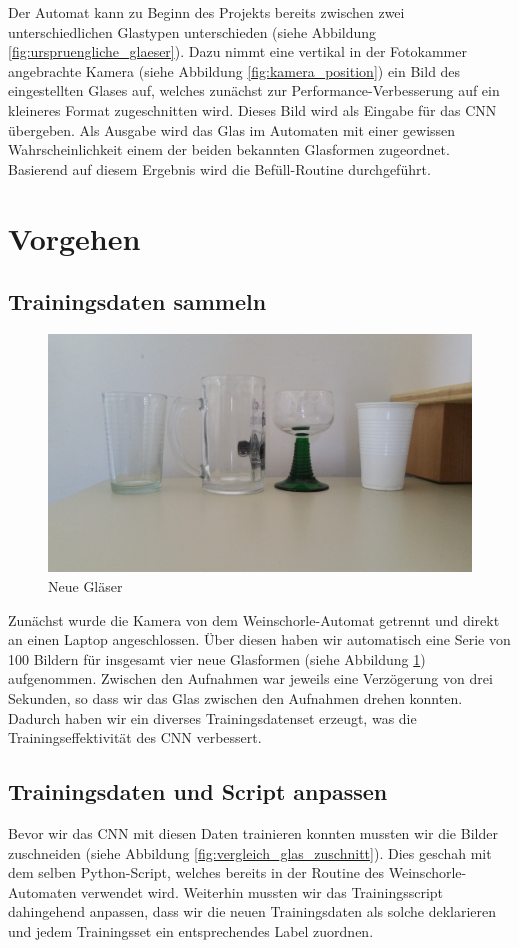 Der Automat kann zu Beginn des Projekts bereits zwischen zwei unterschiedlichen Glastypen unterschieden (siehe Abbildung \ref{fig:urspruengliche_glaeser}). Dazu nimmt eine vertikal in der Fotokammer angebrachte Kamera (siehe Abbildung \ref{fig:kamera_position}) ein Bild des eingestellten Glases auf, welches zunächst zur Performance-Verbesserung auf ein kleineres Format zugeschnitten wird. Dieses Bild wird als Eingabe für das \ac{CNN} übergeben. Als Ausgabe wird das Glas im Automaten mit einer gewissen Wahrscheinlichkeit einem der beiden bekannten Glasformen zugeordnet. Basierend auf diesem Ergebnis wird die Befüll-Routine durchgeführt.
\clearpage

\section{Vorgehen}
\subsection{Trainingsdaten sammeln}
\begin{figure}[!h]
	\centering
	\includegraphics[width=0.7\linewidth]{content/pictures/neue_glaeser}
	\caption{Neue Gläser}
	\label{fig:neue_glaeser}
\end{figure}
Zunächst wurde die Kamera von dem Weinschorle-Automat getrennt und direkt an einen Laptop angeschlossen. Über diesen haben wir automatisch eine Serie von 100 Bildern für insgesamt vier neue Glasformen (siehe Abbildung \ref{fig:neue_glaeser}) aufgenommen. Zwischen den Aufnahmen war jeweils eine Verzögerung von drei Sekunden, so dass wir das Glas zwischen den Aufnahmen drehen konnten. Dadurch haben wir ein diverses Trainingsdatenset erzeugt, was die Trainingseffektivität des \ac{CNN} verbessert. 

\subsection{Trainingsdaten und Script anpassen}
Bevor wir das \ac{CNN} mit diesen Daten trainieren konnten mussten wir die Bilder zuschneiden (siehe Abbildung \ref{fig:vergleich_glas_zuschnitt}). Dies geschah mit dem selben Python-Script, welches bereits in der Routine des Weinschorle-Automaten verwendet wird. Weiterhin mussten wir das Trainingsscript dahingehend anpassen, dass wir die neuen Trainingsdaten als solche deklarieren und jedem Trainingsset ein entsprechendes Label zuordnen.

